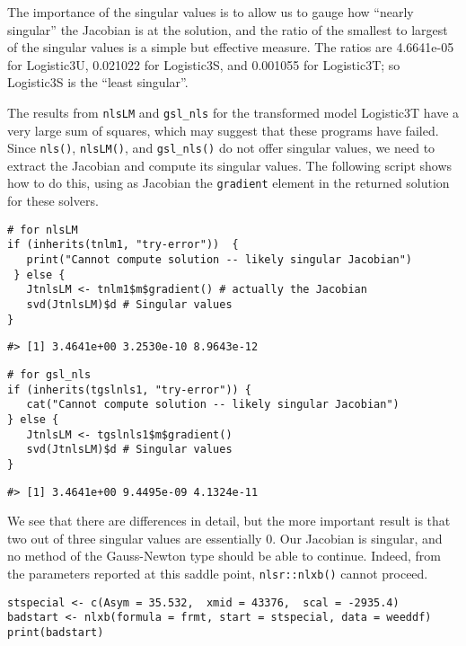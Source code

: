The importance of the singular values is to allow us to gauge how ``nearly singular''
the Jacobian is at the solution, and the ratio of the smallest to largest of the
singular values is a simple but effective measure. The ratios are
4.6641e-05 for Logistic3U, 0.021022 for Logistic3S, and 0.001055 for
Logistic3T; so Logistic3S is the ``least singular''.

The results from \texttt{nlsLM} and \texttt{gsl\_nls} for the transformed model Logistic3T have a
very large sum of squares, which may suggest that these programs have failed.
Since \texttt{nls()}, \texttt{nlsLM()}, and \texttt{gsl\_nls()} do not
offer singular values, we need to extract the Jacobian and compute its
singular values. The following script shows how to do this, using as Jacobian
the \texttt{gradient} element in the returned solution for these solvers.

\begin{verbatim}
# for nlsLM
if (inherits(tnlm1, "try-error"))  {
   print("Cannot compute solution -- likely singular Jacobian")
 } else {  
   JtnlsLM <- tnlm1$m$gradient() # actually the Jacobian
   svd(JtnlsLM)$d # Singular values
}   
\end{verbatim}

\begin{verbatim}
#> [1] 3.4641e+00 3.2530e-10 8.9643e-12
\end{verbatim}

\begin{verbatim}
# for gsl_nls
if (inherits(tgslnls1, "try-error")) {
   cat("Cannot compute solution -- likely singular Jacobian")
} else {  
   JtnlsLM <- tgslnls1$m$gradient()
   svd(JtnlsLM)$d # Singular values
}   
\end{verbatim}

\begin{verbatim}
#> [1] 3.4641e+00 9.4495e-09 4.1324e-11
\end{verbatim}

We see that there are differences in detail, but the more important result is that
two out of three singular values are essentially 0. Our Jacobian is singular, and no
method of the Gauss-Newton type should be able to continue. Indeed, from the
parameters reported at this saddle point, \texttt{nlsr::nlxb()} cannot proceed.

\begin{verbatim}
stspecial <- c(Asym = 35.532,  xmid = 43376,  scal = -2935.4)
badstart <- nlxb(formula = frmt, start = stspecial, data = weeddf)
print(badstart)
\end{verbatim}

